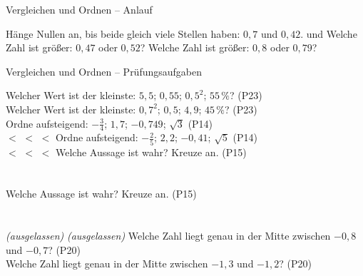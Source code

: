\setcounter{aufgabe}{0}

\begin{aufgabe}{Vergleichen und Ordnen – Anlauf}
\begin{teile}
\teil Hänge Nullen an, bis beide gleich viele Stellen haben: $0{,}7$ und $0{,}42$. \leerfeld und \leerfeld
\teil Welche Zahl ist größer: $0{,}47$ oder $0{,}52$? \leerfeld
\teil Welche Zahl ist größer: $0{,}8$ oder $0{,}79$? \leerfeld
\end{teile}
\end{aufgabe}

\begin{aufgabe}{Vergleichen und Ordnen – Prüfungsaufgaben}
\begin{teile}
\teil Welcher Wert ist der kleinste: $5{,}5$; $0{,}55$; $0{,}5^2$; $55\,\%$? \hfill (P23) \\ \leerfeld
\teil Welcher Wert ist der kleinste: $0{,}7^2$; $0{,}5$; $4{,}9$; $45\,\%$? \hfill (P23) \\ \leerfeld
\teil Ordne aufsteigend: $-\frac{3}{4}$; $1{,}7$; $-0{,}749$; $\sqrt{3}$ \hfill (P14) \\ \leerfeld $<$ \leerfeld $<$ \leerfeld $<$ \leerfeld
\teil Ordne aufsteigend: $-\frac{2}{5}$; $2{,}2$; $-0{,}41$; $\sqrt{5}$ \hfill (P14) \\ \leerfeld $<$ \leerfeld $<$ \leerfeld $<$ \leerfeld
\teil Welche Aussage ist wahr? Kreuze an. \hfill (P15)\\ \\ \\ 
\teil Welche Aussage ist wahr? Kreuze an. \hfill (P15)\\ \\ \\ 
\teil \textit{(ausgelassen)}
\teil \textit{(ausgelassen)}
\teil Welche Zahl liegt genau in der Mitte zwischen $-0{,}8$ und $-0{,}7$? \hfill (P20) \\ \leerfeld
\teil Welche Zahl liegt genau in der Mitte zwischen $-1{,}3$ und $-1{,}2$? \hfill (P20) \\ \leerfeld
\end{teile}
\end{aufgabe}

